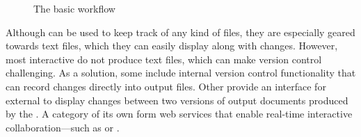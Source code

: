 \begin{figure}
  
  \caption{The basic  workflow}
\end{figure}

\begin{figure}
  
  
\end{figure}

Although  can be used to keep track of any kind of files, they are
especially geared towards text files, which they can easily display along with
changes. However, most interactive  do not produce text files, which
can make version control challenging. As a solution, some  include
internal version control functionality that can record changes directly into
output files. Other  provide an interface for external  to display changes between two
versions of output documents produced by the . A category of its own
form web services that enable real-time interactive collaboration---such as
 or .

